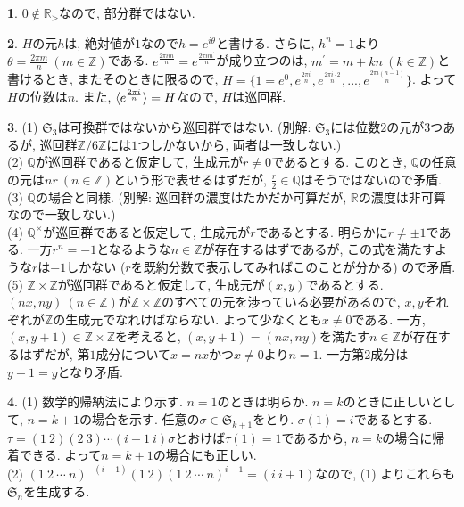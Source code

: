 \documentclass{article}
\theoremstyle{definition}
\newtheorem{ans}{}
\numberwithin{ans}{subsection}
\newcommand{\Z}[1]{\mathbb{Z}/#1\mathbb{Z}}
\DeclarePairedDelimiter{\gen}{\langle}{\rangle}
\begin{document}
\begin{ans}
  $0 \notin \mathbb{R}_>$なので, 部分群ではない.
\end{ans}

\begin{ans}
  $H$の元$h$は, 絶対値が$1$なので$h = e^{i\theta}$と書ける.
  さらに, $h^n = 1$より$\theta = \frac{2\pi m}{n}\ (m \in \mathbb{Z})$である.
  $e^\frac{2\pi im}{n} = e^\frac{2\pi i m^\prime}{n}$が成り立つのは,
  $m^\prime = m + kn\ (k \in \mathbb{Z})$と書けるとき, またそのときに限るので,
  $H = \{1 = e^0, e^\frac{2\pi i}{n}, e^\frac{2\pi i \cdot 2}{n},..., e^\frac{2\pi i(n - 1)}{n}\}$.
  よって$H$の位数は$n$.
  また, $\gen{e^\frac{2\pi i}{n}} = H$なので, $H$は巡回群.
\end{ans}

\begin{ans}
  (1) $\mathfrak{S}_3$は可換群ではないから巡回群ではない.
  (別解: $\mathfrak{S}_3$には位数$2$の元が$3$つあるが, 巡回群$\Z{6}$には$1$つしかないから, 両者は一致しない.) \\
  (2) $\mathbb{Q}$が巡回群であると仮定して, 生成元が$r \neq 0$であるとする.
  このとき, $\mathbb{Q}$の任意の元は$nr\ (n \in \mathbb{Z})$という形で表せるはずだが, $\frac{r}{2} \in \mathbb{Q}$はそうではないので矛盾. \\
  (3) $\mathbb{Q}$の場合と同様. (別解: 巡回群の濃度はたかだか可算だが, $\mathbb{R}$の濃度は非可算なので一致しない.) \\
  (4) $\mathbb{Q}^\times$が巡回群であると仮定して, 生成元が$r$であるとする.
  明らかに$r \neq \pm 1$である. 一方$r^{n} = -1$となるような$n \in \mathbb{Z}$が存在するはずであるが,
  この式を満たすような$r$は$-1$しかない ($r$を既約分数で表示してみればこのことが分かる) ので矛盾.
  \\
  (5) $\mathbb{Z} \times \mathbb{Z}$が巡回群であると仮定して, 生成元が$(x, y)$であるとする.
  $(nx, ny)\ (n \in \mathbb{Z})$が$\mathbb{Z} \times \mathbb{Z}$のすべての元を渉っている必要があるので,
  $x, y$それぞれが$\mathbb{Z}$の生成元でなれけばならない. よって少なくとも$x \neq 0$である.
  一方, $(x, y + 1) \in \mathbb{Z} \times \mathbb{Z}$を考えると,
  $(x, y + 1) = (nx, ny)$を満たす$n \in \mathbb{Z}$が存在するはずだが,
  第$1$成分について$x = nx$かつ$x \neq 0$より$n = 1$. 一方第$2$成分は$y + 1 = y$となり矛盾.
\end{ans}

\begin{ans}
  (1) 数学的帰納法により示す. $n = 1$のときは明らか.
  $n = k$のときに正しいとして, $n = k + 1$の場合を示す.
  任意の$\sigma \in \mathfrak{S}_{k + 1}$をとり.
  $\sigma(1) = i$であるとする.
  $\tau = (1\ 2)(2\ 3)\cdots(i-1\ i)\sigma$とおけば$\tau(1) = 1$であるから,
  $n = k$の場合に帰着できる. よって$n = k + 1$の場合にも正しい. \\
  (2) $(1\ 2\ \cdots\ n)^{-(i-1)}(1\ 2)(1\ 2\ \cdots\ n)^{i-1} = (i\ i + 1)$なので,
  (1) よりこれらも$\mathfrak{S}_n$を生成する.
\end{ans}
\end{document}
